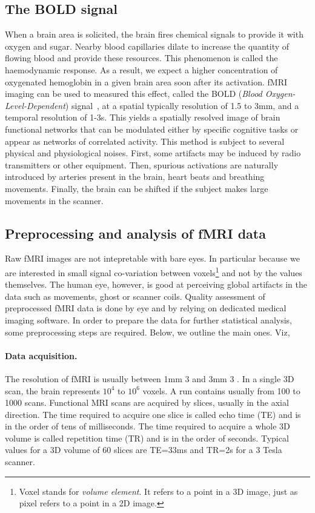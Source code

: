 \subsection{The BOLD signal}
When a brain area is solicited, the brain fires chemical signals to provide it
with oxygen and sugar. Nearby blood capillaries dilate to increase the quantity
of flowing blood and provide these resources. This phenomenon is called the
haemodynamic response.
As a result, we expect a higher concentration of oxygenated hemoglobin
in a given brain area soon after its activation.
fMRI imaging can be used to measured this effect, called the BOLD (\textit{Blood Oxygen-Level-Dependent}) signal~\citep{agawa1990,ogawa1990b}, at a spatial typically resolution of 1.5 to 3mm, and a temporal resolution
of 1-3s. This yields a spatially resolved image of
brain functional networks that can be modulated
either by specific cognitive tasks or appear as
networks of correlated activity. This method is subject to several physical and physiological
noises. First,
some artifacts may be induced by radio transmitters or other equipment. Then,
spurious activations are naturally introduced by arteries present in
the brain, heart beats and breathing movements. Finally, the brain can be
shifted if the subject makes large movements in the scanner.

\subsection{Preprocessing and analysis of fMRI data}
Raw fMRI images are not intepretable with bare eyes. In particular because
we are interested in small signal co-variation between voxels\footnote{Voxel stands for \textit{volume element}. It refers
to a point in a 3D image, just as pixel refers to a point in a 2D image.}  and not by the
values themselves. The human eye, however, is good at perceiving global artifacts
in the data such as movements, ghost or scanner coils. Quality assessment of
preprocessed fMRI data is done by eye and by relying on dedicated medical
imaging software. In order to prepare the data for further statistical analysis,
some preprocessing steps are required. Below, we outline the main ones. Viz,

\paragraph{Data acquisition.}
The resolution of fMRI is usually between 1mm 3 and
3mm 3 . In a single 3D scan, the brain represents $10^4$ to $10^6$ voxels.
A run contains usually from 100 to 1000 scans. Functional MRI scans are
acquired by slices, usually in the axial direction. The time required to acquire
one slice is called echo time (TE) and is in the order of tens of milliseconds.
The time required to acquire a whole 3D volume is called repetition time (TR)
and is in the order of seconds. Typical values for a 3D volume of 60 slices are
TE=33ms and TR=2s for a 3 Tesla scanner.

